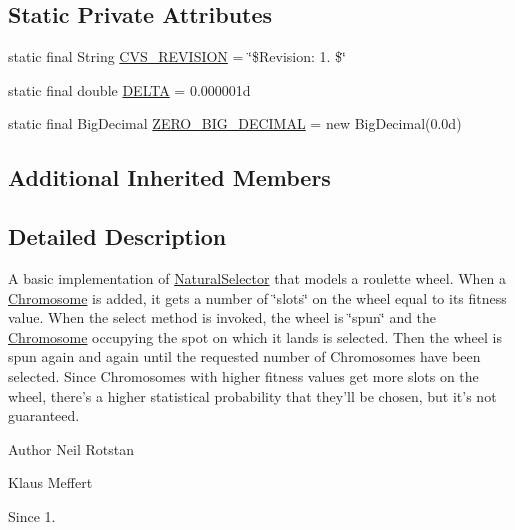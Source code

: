 \subsection*{Static Private Attributes}
\begin{DoxyCompactItemize}
\item 
static final String \hyperlink{classorg_1_1jgap_1_1impl_1_1_weighted_roulette_selector_ab462052fe73bae7036fa4f8625d5a2fc}{C\-V\-S\-\_\-\-R\-E\-V\-I\-S\-I\-O\-N} = \char`\"{}\$Revision\-: 1. \$\char`\"{}
\item 
static final double \hyperlink{classorg_1_1jgap_1_1impl_1_1_weighted_roulette_selector_aa0e65ef8a77636cbea4ece7a3bcacc71}{D\-E\-L\-T\-A} = 0.\-000001d
\item 
static final Big\-Decimal \hyperlink{classorg_1_1jgap_1_1impl_1_1_weighted_roulette_selector_a7ec7736a02e3288af740a2a129ab6386}{Z\-E\-R\-O\-\_\-\-B\-I\-G\-\_\-\-D\-E\-C\-I\-M\-A\-L} = new Big\-Decimal(0.\-0d)
\end{DoxyCompactItemize}
\subsection*{Additional Inherited Members}


\subsection{Detailed Description}
A basic implementation of \hyperlink{classorg_1_1jgap_1_1_natural_selector}{Natural\-Selector} that models a roulette wheel. When a \hyperlink{classorg_1_1jgap_1_1_chromosome}{Chromosome} is added, it gets a number of \char`\"{}slots\char`\"{} on the wheel equal to its fitness value. When the select method is invoked, the wheel is \char`\"{}spun\char`\"{} and the \hyperlink{classorg_1_1jgap_1_1_chromosome}{Chromosome} occupying the spot on which it lands is selected. Then the wheel is spun again and again until the requested number of Chromosomes have been selected. Since Chromosomes with higher fitness values get more slots on the wheel, there's a higher statistical probability that they'll be chosen, but it's not guaranteed.

\begin{DoxyAuthor}{Author}
Neil Rotstan 

Klaus Meffert 
\end{DoxyAuthor}
\begin{DoxySince}{Since}
1. 
\end{DoxySince}


